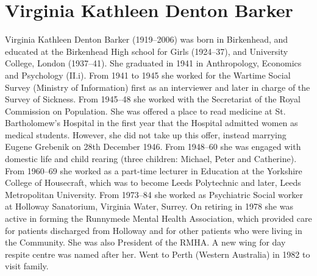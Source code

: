 \section{Virginia Kathleen Denton Barker}\label{Virginia_Kathleen_Denton_Barker}

Virginia Kathleen Denton Barker (1919--2006) was born in Birkenhead, and educated at the Birkenhead High school for Girls (1924--37), and University College, London (1937--41). She graduated in 1941 in Anthropology, Economics and Psychology (II.i). From 1941 to 1945 she worked for the Wartime Social Survey (Ministry of Information) first as an interviewer and later in charge of the Survey of Sickness. From 1945--48 she worked with the Secretariat of the Royal Commission on Population. She was offered a place to read medicine at St. Bartholomew's Hospital in the first year that the Hospital admitted women as medical students. However, she did not take up this offer, instead marrying Eugene Grebenik on 28th December 1946. From 1948--60 she was engaged with domestic life and child rearing (three children: Michael, Peter and Catherine). From 1960--69 she worked as a part-time lecturer in Education at the Yorkshire College of Housecraft, which was to become Leeds Polytechnic and later, Leeds Metropolitan University. From 1973--84 she worked as Psychiatric Social worker at Holloway Sanatorium, Virginia Water, Surrey. On retiring in 1978 she was active in forming the Runnymede Mental Health Association, which provided care for patients discharged from Holloway and for other patients who were living in the Community. She was also President of the RMHA. A new wing for day respite centre was named after her. \cite{VirginiaDocs} Went to Perth (Western Australia) in 1982 to visit family.
